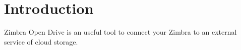 \chapter{Introduction}

Zimbra Open Drive is an useful tool to connect your Zimbra to an external service of cloud storage.



